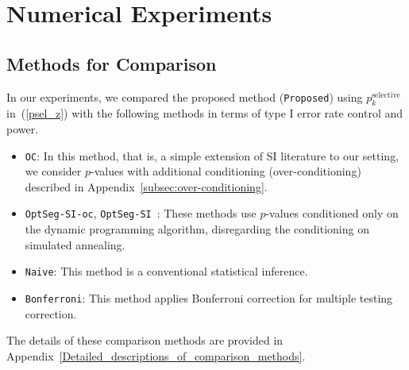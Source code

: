 \section{Numerical Experiments}
\label{sec:Experiment}

\subsection{Methods for Comparison}
In our experiments, we compared the proposed method (\texttt{Proposed}) using $p_k^{\text{selective}}$ in~(\ref{psel_z}) with the following methods 
in terms of type I error rate control and power.
\begin{itemize}
  \item \texttt{OC}: In this method, that is, a simple extension of SI literature to our setting, 
  we consider $p$-values with additional conditioning (over-conditioning) described in Appendix~\ref{subsec:over-conditioning}.
  \item \texttt{OptSeg-SI-oc}, \texttt{OptSeg-SI}~\citep{duy2020computing}: 
  These methods use $p$-values conditioned only on the dynamic programming algorithm, disregarding the conditioning on simulated annealing.
  \item \texttt{Naive}: This method is a conventional statistical inference.
  \item \texttt{Bonferroni}: This method applies Bonferroni correction for multiple testing correction.
\end{itemize}
The details of these comparison methods are provided in Appendix~\ref{Detailed_descriptions_of_comparison_methods}.

